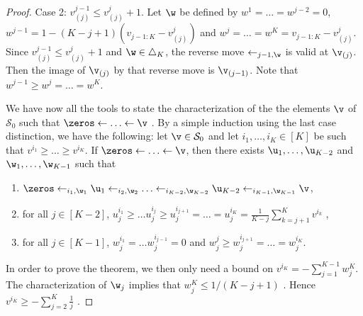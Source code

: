 \begin{proof}
Case 2: $v_{(j)}^{j-1} \le v_{(j)}^j + 1$. Let $\w$ be defined by $w^1 = \ldots = w^{j-2} = 0$, $w^{j-1} = 1 - (K-j+1)(v_{j-1:K} - v_{(j)}^j)$ and $w^j = \ldots = w^K = v_{j-1:K} - v_{(j)}^j$. Since $v_{(j)}^{j-1} \le v_{(j)}^j + 1$ and $\w\in\triangle_K$, the reverse move $\leftarrow_{j-1,\w}$ is valid at $\v_{(j)}$. Then the image of $\v_{(j)}$ by that reverse move is $\v_{(j-1)}$. Note that $w^{j-1} \ge w^j = \ldots = w^K$.

We have now all the tools to state the characterization of the the elements $\v$ of $\mathcal S_0$ such that $\zeros \leftarrow \ldots \leftarrow \v$ . By a simple induction using the last case distinction, we have the following:
let $\v \in \mathcal S_0$ and let $i_1, \ldots, i_K\in[K]$ be such that $v^{i_1} \ge \ldots \ge v^{i_K}$. If $\zeros \leftarrow \ldots \leftarrow \v$, then there exists $\u_1, \ldots, \u_{K-2}$ and $\w_1, \ldots, \w_{K-1}$ such that
\begin{enumerate}
\item $\zeros \leftarrow _{i_1,\w_1} \u_1 \leftarrow_{i_2,\w_2} \ldots \leftarrow_{i_{K-2},\w_{K-2}} \u_{K-2} \leftarrow_{i_{K-1}, \w_{K-1}} \v$,
\item for all $j \in [K-2]$, $u_j^{i_1} \ge \ldots u_j^{i_j} \ge u_j^{i_{j+1}} = \ldots = u_j^{i_K} = \frac{1}{K-j}\sum_{k=j+1}^K v^{i_k}$ ,
\item for all $j \in [K-1]$, $w_j^{i_1} = \ldots w_j^{i_{j-1}} = 0$ and $w_j^j \ge w_j^{i_{j+1}} = \ldots = w_j^{i_K}$. 
\end{enumerate}
In order to prove the theorem, we then only need a bound on $v^{i_K} = - \sum_{j=1}^{K-1} w_j^K$. The characterization of $\w_j$ implies that $w_j^K \leq 1/(K-j+1)$ . Hence $v^{i_K} \ge - \sum_{j=2}^{K} \frac{1}{j}$ .

\end{proof}
